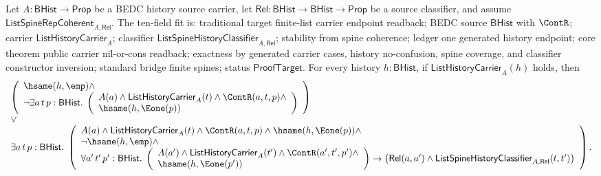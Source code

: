 \begin{theorem}
\label{thm:list-public-carrier-constructor-readback-under-spine-coherence}
Let $A:\mathsf{BHist}\to\mathsf{Prop}$ be a BEDC history source carrier, let
$\mathsf{Rel}:\mathsf{BHist}\to\mathsf{BHist}\to\mathsf{Prop}$ be a source
classifier, and assume $\mathsf{ListSpineRepCoherent}_{A,\mathsf{Rel}}$. The
ten-field fit is: traditional target finite-list carrier endpoint readback;
BEDC source $\mathsf{BHist}$ with $\ContR$; carrier
$\mathsf{ListHistoryCarrier}_A$; classifier
$\mathsf{ListSpineHistoryClassifier}_{A,\mathsf{Rel}}$; stability from spine
coherence; ledger one generated history endpoint; core theorem public carrier
nil-or-cons readback; exactness by generated carrier cases, history
no-confusion, spine coverage, and classifier constructor inversion; standard
bridge finite spines; status $\mathsf{ProofTarget}$. For every history
$h:\mathsf{BHist}$, if $\mathsf{ListHistoryCarrier}_A(h)$ holds, then
$$
\begin{array}{l}
\left(
\begin{array}{l}
\hsame(h,\emp)\land\\
\neg\exists a\,t\,p:\mathsf{BHist}.\;
\left(
\begin{array}{l}
A(a)\land \mathsf{ListHistoryCarrier}_A(t)\land
\ContR(a,t,p)\land\\
\hsame(h,\Eone(p))
\end{array}
\right)
\end{array}
\right)\\
\lor\\
\exists a\,t\,p:\mathsf{BHist}.\;
\left(
\begin{array}{l}
A(a)\land \mathsf{ListHistoryCarrier}_A(t)\land
\ContR(a,t,p)\land \hsame(h,\Eone(p))\land\\
\neg\hsame(h,\emp)\land\\
\forall a'\,t'\,p':\mathsf{BHist}.\;
\left(
\begin{array}{l}
A(a')\land \mathsf{ListHistoryCarrier}_A(t')\land
\ContR(a',t',p')\land\\
\hsame(h,\Eone(p'))
\end{array}
\right)
\to
\left(
\mathsf{Rel}(a,a')\land
\mathsf{ListSpineHistoryClassifier}_{A,\mathsf{Rel}}(t,t')
\right)
\end{array}
\right).
\end{array}
$$
\end{theorem}
